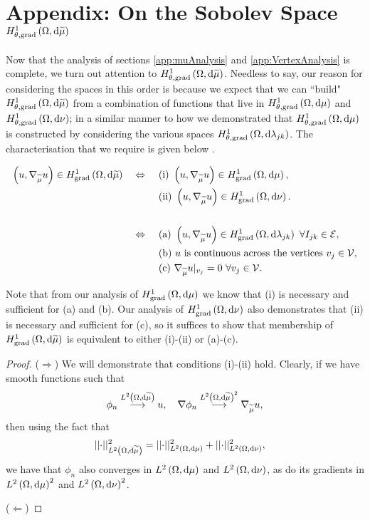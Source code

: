 \section{Appendix: On the Sobolev Space $H^1_{\theta, \mathrm{grad}}\left( \Omega, \mathrm{d}\widetilde{\mu} \right)$} \label{app:SumMeasureAnalysis}
Now that the analysis of sections \ref{app:muAnalysis} and \ref{app:VertexAnalysis} is complete, we turn out attention to $H^1_{\theta, \mathrm{grad}}\left( \Omega, \mathrm{d}\widetilde{\mu} \right)$.
Needless to say, our reason for considering the spaces in this order is because we expect that we can ``build" $H^1_{\theta, \mathrm{grad}}\left( \Omega, \mathrm{d}\widetilde{\mu} \right)$ from a combination of functions that live in $H^1_{\theta, \mathrm{grad}}\left( \Omega, \mathrm{d}\mu \right)$ and $H^1_{\theta, \mathrm{grad}}\left( \Omega, \mathrm{d}\nu \right)$; in a similar manner to how we demonstrated that $H^1_{\theta, \mathrm{grad}}\left( \Omega, \mathrm{d}\mu \right)$ is constructed by considering the various spaces $H^1_{\theta, \mathrm{grad}}\left( \Omega, \mathrm{d}\lambda_{jk} \right)$.
The characterisation that we require is given below .
\begin{conjecture} \label{conj:ThickVertexSpaceCharacterisation}
	\begin{align*}
		\left( u, \nabla_{\widetilde{\mu}}u \right)\in H^1_\mathrm{grad}\left( \Omega, \mathrm{d}\widetilde{\mu} \right) \quad\Leftrightarrow\quad
		& \ \text{(i)} \ \left( u, \nabla_{\widetilde{\mu}}u \right)\in H^1_\mathrm{grad}\left( \Omega, \mathrm{d}\mu \right), \\
		& \ \text{(ii)} \ \left( u, \nabla_{\widetilde{\mu}}u \right)\in H^1_\mathrm{grad}\left( \Omega, \mathrm{d}\nu \right). \\
		\\
		\quad\Leftrightarrow\quad
		& \ \text{(a)} \ \left( u, \nabla_{\widetilde{\mu}}u \right)\in H^1_\mathrm{grad}\left( \Omega, \mathrm{d}\lambda_{jk} \right) \ \forall I_{jk}\in\mathcal{E}, \\
		& \ \text{(b)} \ u \text{ is continuous across the vertices} \ v_j\in\mathcal{V}, \\
		& \ \text{(c)} \ \nabla_{\widetilde{\mu}}u\vert_{v_j} = 0 \ \forall v_j\in\mathcal{V}.
	\end{align*}
\end{conjecture}
Note that from our analysis of $H^1_\mathrm{grad}\left( \Omega, \mathrm{d}\mu \right)$ we know that (i) is necessary and sufficient for (a) and (b).
Our analysis of $H^1_\mathrm{grad}\left( \Omega, \mathrm{d}\nu \right)$ also demonstrates that (ii) is necessary and sufficient for (c), so it suffices to show that membership of $H^1_\mathrm{grad}\left( \Omega, \mathrm{d}\widetilde{\mu} \right)$ is equivalent to either (i)-(ii) or (a)-(c).
\begin{proof}
	($\Rightarrow$) We will demonstrate that conditions (i)-(ii) hold.
	Clearly, if we have smooth functions such that
	\begin{align*}
		\phi_n \overset{L^{2}\left( \Omega,\mathrm{d}\widetilde{\mu} \right)}{\longrightarrow} u, \quad \nabla\phi_n\overset{L^{2}\left( \Omega,\mathrm{d}\widetilde{\mu} \right)^2}{\longrightarrow}\nabla_{\widetilde{\mu}}u,
	\end{align*}
	then using the fact that
	\begin{align*}
		\lvert\lvert \cdot \rvert\rvert_{L^{2}\left( \Omega,\mathrm{d}\widetilde{\mu} \right)}^2 &= \lvert\lvert \cdot \rvert\rvert_{L^{2}\left( \Omega,\mathrm{d}\mu \right)}^2 + \lvert\lvert \cdot \rvert\rvert_{L^{2}\left( \Omega,\mathrm{d}\nu \right)}^2,
	\end{align*}
	we have that $\phi_n$ also converges in $L^{2}\left( \Omega,\mathrm{d}\mu \right)$ and $L^{2}\left( \Omega,\mathrm{d}\nu \right)$, as do its gradients in $L^{2}\left( \Omega,\mathrm{d}\mu \right)^2$ and $L^{2}\left( \Omega,\mathrm{d}\nu \right)^2$. \newline
	
	($\Leftarrow$) 
\end{proof}
